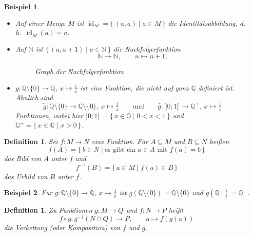 \documentclass[a4paper]{article}
\theoremstyle{kurzskript}
\newtheorem{definition}[satz]{Definition}
\newtheorem*{bsp}{Beispiel}
\newtheorem*{defn}{Definition}
\newcommand{\N}{\mathbb{N}}
\newcommand{\Q}{\mathbb{Q}}
\begin{document}
\begin{bsp}
\leavevmode
\begin{itemize}
  \item Auf einer Menge $M$ ist $\operatorname{id}_M = \{\, (a, a) \mid a \in M \,\}$ die \emph{Identitätsabbildung}, d.\,h.\ $\operatorname{id}_M(a) = a$.
  \item Auf $\N$ ist $\{\, (a, a+1) \mid a \in \N \,\}$ die \emph{Nachfolgerfunktion}
  \[
    \N \to \N, \qquad n \mapsto n + 1.
  \]
  \begin{figure}[H]
  \centering
  \caption{Graph der Nachfolgerfunktion}
  \end{figure}
  \item $g\colon \Q \setminus \{0\} \to \Q$, $x \mapsto \frac1x$ ist eine Funktion, die nicht auf ganz $\Q$ definiert ist. Ähnlich sind
  \[
    \tilde{g}\colon \Q \setminus \{0\} \to \Q \setminus \{0\},\ x \mapsto \tfrac1x
    \qquad\text{und}\qquad
    \hat{g}\colon\, ]0; 1[ \,\to \Q^+,\ x \mapsto \tfrac1x
  \]
  Funktionen, wobei hier $]0; 1[ \,= \{\, x \in \Q \mid 0 < x < 1 \,\}$ und $\Q^+ = \{\, x \in \Q \mid x > 0 \,\}$.
\end{itemize}
\end{bsp}

\begin{defn}
Sei $f\colon M \to N$ eine Funktion. Für $A \subseteq M$ und $B \subseteq N$ heißen
\[
  f(A) = \{\, b \in N \mid \text{es gibt ein } a \in A \text{ mit } f(a) = b \,\}
\]
das \emph{Bild} von $A$ unter $f$ und
\[
  f^{-1}(B) = \{\, a \in M \mid f(a) \in B \,\}
\]
das \emph{Urbild} von $B$ unter $f$.
\end{defn}

\begin{bsp}
Für $g\colon \Q \setminus \{0\} \to \Q$, $x \mapsto \frac1x$ ist $g(\Q \setminus \{0\}) = \Q \setminus \{0\}$ und $g(\Q^+) = \Q^+$.
\end{bsp}

\begin{definition}
Zu Funktionen $g\colon M \to Q$ und $f\colon N \to P$ heißt
\[
  f \circ g\colon g^{-1}(N \cap Q) \to P, \qquad a \mapsto f(g(a))
\]
die \emph{Verkettung} (oder \emph{Komposition}) von $f$ und $g$.
\end{definition}
\end{document}

